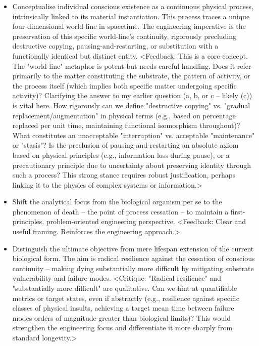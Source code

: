 \documentclass[10pt]{article}
\begin{document}
\begin{sloppypar}
\begin{itemize}
    \item Conceptualise individual conscious existence as a continuous physical process, intrinsically linked to its material instantiation. This process traces a unique four-dimensional world-line in spacetime. The engineering imperative is the preservation of this specific world-line's continuity, rigorously precluding destructive copying, pausing-and-restarting, or substitution with a functionally identical but distinct entity. <Feedback: This is a core concept. The "world-line" metaphor is potent but needs careful handling. Does it refer primarily to the matter constituting the substrate, the pattern of activity, or the process itself (which implies both specific matter undergoing specific activity)? Clarifying the answer to my earlier question (a, b, or c – likely (c)) is vital here. How rigorously can we define "destructive copying" vs. "gradual replacement/augmentation" in physical terms (e.g., based on percentage replaced per unit time, maintaining functional isomorphism throughout)? What constitutes an unacceptable "interruption" vs. acceptable "maintenance" or "stasis"? Is the preclusion of pausing-and-restarting an absolute axiom based on physical principles (e.g., information loss during pause), or a precautionary principle due to uncertainty about preserving identity through such a process? This strong stance requires robust justification, perhaps linking it to the physics of complex systems or information.>

    \item Shift the analytical focus from the biological organism per se to the phenomenon of death – the point of process cessation – to maintain a first-principles, problem-oriented engineering perspective. <Feedback: Clear and useful framing. Reinforces the engineering approach.>

    \item Distinguish the ultimate objective from mere lifespan extension of the current biological form. The aim is radical resilience against the cessation of conscious continuity – making dying substantially more difficult by mitigating substrate vulnerability and failure modes. <Critique: "Radical resilience" and "substantially more difficult" are qualitative. Can we hint at quantifiable metrics or target states, even if abstractly (e.g., resilience against specific classes of physical insults, achieving a target mean time between failure modes orders of magnitude greater than biological limits)? This would strengthen the engineering focus and differentiate it more sharply from standard longevity.>


\end{itemize}
\end{sloppypar}
\end{document}
